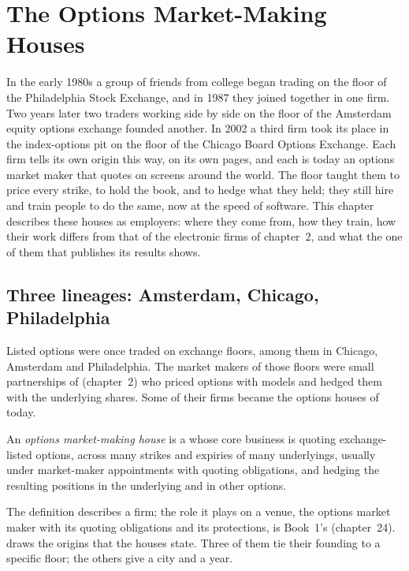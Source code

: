 \chapter{The Options Market-Making Houses}\label{ch:in:the-options-market-making-houses}

In the early 1980s a group of friends from college began trading on the floor of the Philadelphia Stock Exchange, and
in 1987 they joined together in one firm. Two years later two traders working side by side on the floor of the
Amsterdam equity options exchange founded another. In 2002 a third firm took its place in the index-options pit on the
floor of the Chicago Board Options Exchange. Each firm tells its own origin this way, on its own pages, and each is
today an options market maker that quotes on screens around the world. The floor taught them to price every strike,
to hold the book, and to hedge what they held; they still hire and train people to do the same, now at the speed of
software. This chapter describes these houses as employers: where they come from, how they train, how their work
differs from that of the electronic firms of chapter~2, and what the one of them that publishes its results shows.

\section{Three lineages: Amsterdam, Chicago, Philadelphia}

Listed options were once traded on exchange floors, among them in Chicago, Amsterdam and Philadelphia. The market
makers of those floors were small partnerships of  (chapter~2) who priced options with
models and hedged them with the underlying shares. Some of their firms became the options houses of today.

\begin{definition}\label{def:in:the-options-market-making-houses:house}
An \emph{options market-making house} is a  whose core business
is quoting exchange-listed options, across many strikes and expiries of many underlyings, usually under market-maker
appointments with quoting obligations, and hedging the resulting positions in the underlying and in other options.
\end{definition}

The definition describes a firm; the role it plays on a venue, the options market maker with its quoting obligations
and its protections, is Book~1's (chapter~24).  draws the origins
that the houses state. Three of them tie their founding to a specific floor; the others give a city and a year.

